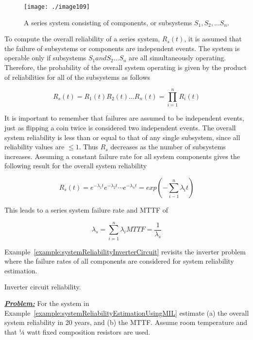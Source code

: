 {\begin{figure}[h]
\centering
\texttt{[image: ./image109]}
\caption{A series system consisting of components, or subsystems $S_1, S_2, \ldots S_n$.}
\label{figure:seriesSystems}
\end{figure}

To compute the overall reliability of a series system, $R_s(t)$, 
it is assumed that the failure
of subsystems or components are independent events. The system is
operable only if subsystems $S_1 and S_2 \ldots S_n$ are all simultaneously
operating. Therefore, the probability of the overall system operating is
given by the product of reliabilities for all of the subsystems as
follows

\begin{equation}
\label{equ:systemReliabilitySeriesProbability}
R_s(t) = R_1(t)R_2(t)\ldots R_n(t) = \prod_{i=1}^n R_i(t) 
\end{equation}

It is important to remember that failures are assumed to be independent
events, just as flipping a coin twice is considered two independent
events. The overall system reliability is less than or equal to that of
any single subsystem, since all reliability values are $\leq 1$. Thus
$R_s$ decreases as the number of
subsystems increases. Assuming a constant failure rate for all system
components gives the following result for the overall system reliability

\begin{equation}
\label{equ:seriesProbabilityConstantErrorRate}
R_s(t) = e^{-\lambda_1t}e^{-\lambda_2t}\cdots e^{-\lambda_nt} = exp(-\sum_{i-1}^n \lambda_i t)
\end{equation}

This leads to a series system failure rate and MTTF of


\begin{equation}
\label{equ:seriesProbabilityMttf}
\lambda_s = \sum_{i=1}^n \lambda_i
MTTF = \frac{1}{\lambda_s}
\end{equation}

Example~\ref{example:systemReliabilityInverterCircuit} 
revisits the inverter problem where the failure rates of all
components are considered for system reliability estimation.


\begin{example}{Inverter circuit reliability.}
\label{example:systemReliabilityInverterCircuit}

\emph{\textbf{\ul{Problem:}}} For the system in 
Example~\ref{example:systemReliabilityEstimationUsingMIL} estimate (a)
the overall system reliability in 20 years, and (b) the MTTF. Assume
room temperature and that ¼ watt fixed composition resistors are used.


\end{example}}
